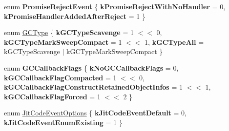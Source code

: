 \begin{DoxyCompactItemize}
\item 
\hypertarget{namespacev8_a307b3674d4966684f8170a4fbd932eaf}{}enum {\bfseries Promise\+Reject\+Event} \{ {\bfseries k\+Promise\+Reject\+With\+No\+Handler} = 0, 
{\bfseries k\+Promise\+Handler\+Added\+After\+Reject} = 1
 \}\label{namespacev8_a307b3674d4966684f8170a4fbd932eaf}

\item 
enum \hyperlink{namespacev8_ac109d6f27e0c0f9ef4e98bcf7a806cf2}{G\+C\+Type} \{ {\bfseries k\+G\+C\+Type\+Scavenge} = 1 $<$$<$ 0, 
{\bfseries k\+G\+C\+Type\+Mark\+Sweep\+Compact} = 1 $<$$<$ 1, 
{\bfseries k\+G\+C\+Type\+All} = k\+G\+C\+Type\+Scavenge $\vert$ k\+G\+C\+Type\+Mark\+Sweep\+Compact
 \}
\item 
\hypertarget{namespacev8_a247c37a849f4d6c293b9b16e94e1944b}{}enum {\bfseries G\+C\+Callback\+Flags} \{ {\bfseries k\+No\+G\+C\+Callback\+Flags} = 0, 
{\bfseries k\+G\+C\+Callback\+Flag\+Compacted} = 1 $<$$<$ 0, 
{\bfseries k\+G\+C\+Callback\+Flag\+Construct\+Retained\+Object\+Infos} = 1 $<$$<$ 1, 
{\bfseries k\+G\+C\+Callback\+Flag\+Forced} = 1 $<$$<$ 2
 \}\label{namespacev8_a247c37a849f4d6c293b9b16e94e1944b}

\item 
enum \hyperlink{namespacev8_a06f34fa4fa4cfc8518366808d1d461c1}{Jit\+Code\+Event\+Options} \{ {\bfseries k\+Jit\+Code\+Event\+Default} = 0, 
{\bfseries k\+Jit\+Code\+Event\+Enum\+Existing} = 1
 \}
\end{DoxyCompactItemize}
